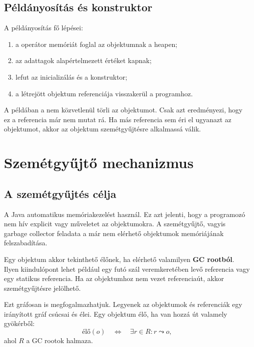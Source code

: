 \subsection{Példányosítás és konstruktor}

A példányosítás fő lépései:

\begin{enumerate}
  \item a  operátor memóriát foglal az objektumnak a heapen;
  \item az adattagok alapértelmezett értéket kapnak;
  \item lefut az inicializálás és a konstruktor;
  \item a létrejött objektum referenciája visszakerül a programhoz.
\end{enumerate}


A példában a  nem közvetlenül törli az objektumot. Csak azt eredményezi, hogy ez a referencia már nem mutat rá. Ha más referencia sem éri el ugyanazt az objektumot, akkor az objektum szemétgyűjtésre alkalmassá válik.

\section{Szemétgyűjtő mechanizmus}

\subsection{A szemétgyűjtés célja}

A Java automatikus memóriakezelést használ. Ez azt jelenti, hogy a programozó nem hív explicit  vagy  műveletet az objektumokra. A szemétgyűjtő, vagyis garbage collector feladata a már nem elérhető objektumok memóriájának felszabadítása.

Egy objektum akkor tekinthető élőnek, ha elérhető valamilyen \textbf{GC rootból}. Ilyen kiindulópont lehet például egy futó szál veremkeretében levő referencia vagy egy statikus referencia. Ha az objektumhoz nem vezet referenciaút, akkor szemétgyűjtésre jelölhető.

Ezt gráfosan is megfogalmazhatjuk. Legyenek az objektumok és referenciák egy irányított gráf csúcsai és élei. Egy objektum élő, ha van hozzá út valamely gyökérből:
\[
  \text{élő}(o)
  \quad\Longleftrightarrow\quad
  \exists r\in R: r \leadsto o,
\]
ahol $R$ a GC rootok halmaza.

